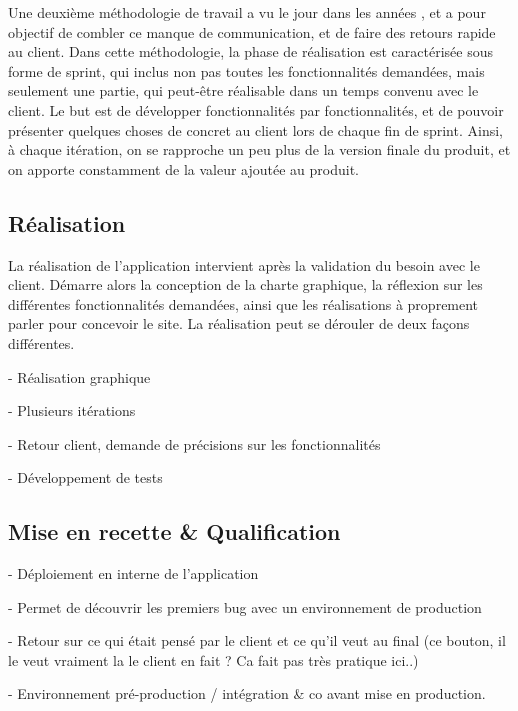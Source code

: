 Une deuxième méthodologie de travail a vu le jour dans les années , et a pour objectif de combler ce manque de communication, et de faire des retours rapide au client. Dans cette méthodologie, la phase de réalisation est caractérisée sous forme de sprint, qui inclus non pas toutes les fonctionnalités demandées, mais seulement une partie, qui peut-être réalisable dans un temps convenu avec le client. Le but est de développer fonctionnalités par fonctionnalités, et de pouvoir présenter quelques choses de concret au client lors de chaque fin de sprint. Ainsi, à chaque itération, on se rapproche un peu plus de la version finale du produit, et on apporte constamment de la valeur ajoutée au produit.



\subsection{Réalisation}

La réalisation de l'application intervient après la validation du besoin avec le client. Démarre alors la conception de la charte graphique, la réflexion sur les différentes fonctionnalités demandées, ainsi que les réalisations à proprement parler pour concevoir le site. La réalisation peut se dérouler de deux façons différentes.

- Réalisation graphique

- Plusieurs itérations

- Retour client, demande de précisions sur les fonctionnalités

- Développement de tests


\subsection{Mise en recette \& Qualification}

- Déploiement en interne de l'application

- Permet de découvrir les premiers bug avec un environnement de production

- Retour sur ce qui était pensé par le client et ce qu'il veut au final (ce bouton, il le veut vraiment la le client en fait ? Ca fait pas très pratique ici..)

- Environnement pré-production / intégration \& co avant mise en production.


